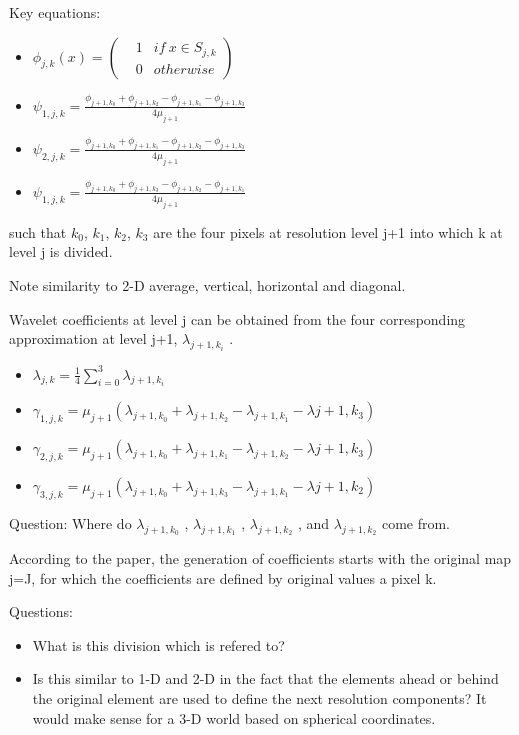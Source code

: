 \documentclass[11pt]{article}
\begin{document}
Key equations:
\begin{itemize}
\item $\phi_{j,k} (x) = 
\left(
\begin{array}{ccc}
  & 1  & if\ x\in S_{j,k}  \\
  & 0  & otherwise  
\end{array}
\right)
$
\item $\psi_{1,j,k} = \frac {\phi_{j+1,k_0} + \phi_{j+1,k_2} - \phi_{j+1, k_1} - \phi_{j+1,k_3}}{4\mu_{j+1}}$
\item $\psi_{2,j,k} = \frac {\phi_{j+1,k_0} + \phi_{j+1,k_1} - \phi_{j+1, k_2} - \phi_{j+1,k_3}}{4\mu_{j+1}}$
\item $\psi_{1,j,k} = \frac {\phi_{j+1,k_0} + \phi_{j+1,k_3} - \phi_{j+1, k_2} - \phi_{j+1,k_1}}{4\mu_{j+1}}$
\end{itemize}

such that 
$k_0$, $k_1$, $k_2$, $k_3$ are the four pixels at resolution level j+1 into which k at level j is divided.  

Note similarity to 2-D average, vertical, horizontal and diagonal.  

Wavelet coefficients at level j can be obtained from the four corresponding approximation at level j+1, $\lambda _{j+1,k_i}$  .  

\begin{itemize}
\item $\lambda_{j,k} = \frac{1}{4} \sum\limits^3_{i=0} \lambda_{j+1,k_i} $

\item $\gamma_{1,j,k} = \mu_{j+1} (\lambda_{j+1,k_0} + \lambda_{j+1,k_2} -\lambda_{j+1,k_1} - \lambda{j+1,k_3})$

\item $\gamma_{2,j,k} = \mu_{j+1} (\lambda_{j+1,k_0} + \lambda_{j+1,k_1} -\lambda_{j+1,k_2} - \lambda{j+1,k_3})$


\item $\gamma_{3,j,k} = \mu_{j+1} (\lambda_{j+1,k_0} + \lambda_{j+1,k_3} -\lambda_{j+1,k_1} - \lambda{j+1,k_2})$
\end {itemize}

Question: Where do $ \lambda_{j+1,k_0}$ , $\lambda_{j+1,k_1}$  , $\lambda_{j+1, k_2}$ , and $\lambda_{j+1, k_2}$ come from.

According to the paper, the generation of coefficients starts with the original map j=J, for which the coefficients are defined by original values a pixel k.  

Questions:  
\begin{itemize}
\item What is this division which is refered to?  
\item Is this similar to 1-D and 2-D in the fact that the elements ahead or behind the original element are used to define the next resolution components?  It would make sense for a 3-D world based on spherical coordinates.  
\end{itemize}





 
\end{document}
